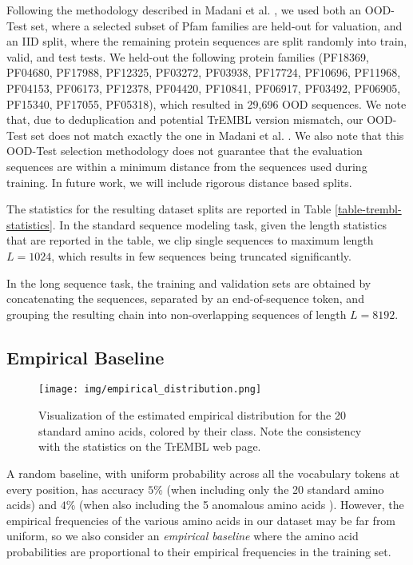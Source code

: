 Following the methodology described in Madani et al. \citep{progen}, we used both an OOD-Test set, where a selected subset of Pfam families are held-out for valuation, and an IID split, where the remaining protein sequences are split randomly into train, valid, and test tests. We held-out the following protein families (PF18369, PF04680, PF17988, PF12325, PF03272, PF03938, PF17724, PF10696, PF11968, PF04153, PF06173, PF12378, PF04420, PF10841, PF06917, PF03492, PF06905, PF15340, PF17055, PF05318), which resulted in 29,696 OOD sequences. We note that, due to deduplication and potential TrEMBL version mismatch, our OOD-Test set does not match exactly the one in Madani et al. \citep{progen}. We also note that this OOD-Test selection methodology does not guarantee that the evaluation sequences are within a minimum distance from the sequences used during training. In future work, we will include rigorous distance based splits.

The statistics for the resulting dataset splits are reported in Table \ref{table-trembl-statistics}. In the standard sequence modeling task, given the length statistics that are reported in the table, we clip single sequences to maximum length $L=1024$, which results in few sequences being truncated significantly.

In the long sequence task, the training and validation sets are obtained by concatenating the sequences, separated by an end-of-sequence token, and grouping the resulting chain into non-overlapping sequences of length $L=8192$.



\subsection{Empirical Baseline}

\begin{figure}[h]
  \centering
  \texttt{[image: img/empirical\_distribution.png]}
  \caption{\small{Visualization of the estimated empirical distribution for the 20 standard amino acids, colored by their class. Note the consistency with the statistics on the TrEMBL web page.}}
  \vspace{2mm}
  \label{figure-empirical-baseline}
\end{figure}

A random baseline, with uniform probability across all the vocabulary tokens at every position, has accuracy $5\%$ (when including only the 20 standard amino acids) and $4\%$ (when also including the 5 anomalous amino acids \citep{uniprot2019uniprot}). However, the empirical frequencies of the various amino acids in our dataset may be far from uniform, so we also consider an \textit{empirical baseline} where the amino acid probabilities are proportional to their empirical frequencies in the training set.

